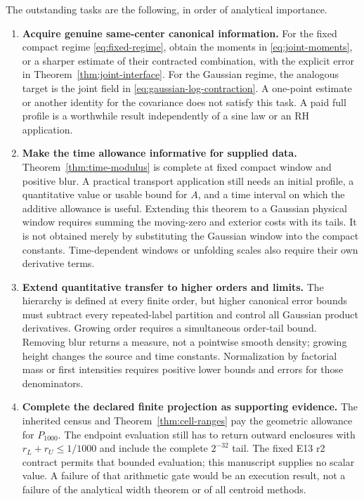 The outstanding tasks are the following, in order of analytical importance.

\begin{enumerate}[leftmargin=*,itemsep=0.55em]
\item \textbf{Acquire genuine same-center canonical information.}
For the fixed compact regime \eqref{eq:fixed-regime}, obtain the moments
in \eqref{eq:joint-moments}, or a sharper estimate of their contracted
combination, with the explicit error in Theorem~\ref{thm:joint-interface}.
For the Gaussian regime, the analogous target is the joint field in
\eqref{eq:gaussian-log-contraction}. A one-point estimate or another
identity for the covariance does not satisfy this task. A paid full
profile is a worthwhile result independently of a sine law or an RH
application.

\item \textbf{Make the time allowance informative for supplied data.}
Theorem~\ref{thm:time-modulus} is complete at fixed compact window and
positive blur. A practical transport application still needs an initial
profile, a quantitative value or usable bound for $A$, and a time interval
on which the additive allowance is useful. Extending this theorem to a
Gaussian physical window requires summing the moving-zero and exterior
costs with its tails. It is not obtained merely by substituting the
Gaussian window into the compact constants. Time-dependent windows or
unfolding scales also require their own derivative terms.

\item \textbf{Extend quantitative transfer to higher orders and limits.}
The hierarchy is defined at every finite order, but higher canonical
error bounds must subtract every repeated-label partition and control
all Gaussian product derivatives. Growing order requires a simultaneous
order-tail bound. Removing blur returns a measure, not a pointwise
smooth density; growing height changes the source and time constants.
Normalization by factorial mass or first intensities requires positive
lower bounds and errors for those denominators.

\item \textbf{Complete the declared finite projection as supporting evidence.}
The inherited census and Theorem~\ref{thm:cell-ranges} pay the geometric
allowance for $P_{1000}$. The endpoint evaluation still has to return
outward enclosures with $r_L+r_U\le1/1000$ and include the complete
$2^{-32}$ tail. The fixed E13 r2 contract permits that bounded evaluation;
this manuscript supplies no scalar value. A failure of that arithmetic
gate would be an execution result, not a failure of the analytical
width theorem or of all centroid methods.


\end{enumerate}
